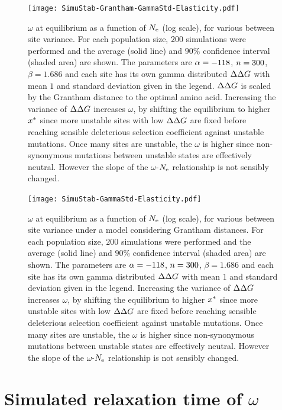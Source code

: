 \begin{figure}[H]
    \centering
    \texttt{[image: SimuStab-Grantham-GammaStd-Elasticity.pdf]}
    \caption[Effect of site variance on the susceptibility]{
    $\omega$ at equilibrium as a function of $N_{\text{e}}$ (log scale), for various between site variance.
    For each population size, $200$ simulations were performed and the average (solid line) and $90\%$ confidence interval (shaded area) are shown.
    The parameters are $\alpha=-118$, $n=300$, $\beta=1.686$ and each site has its own gamma distributed $\Delta \Delta G$ with mean $1$ and standard deviation given in the legend. $\Delta \Delta G$ is scaled by the Grantham distance to the optimal amino acid.
    Increasing the variance of $\Delta \Delta G$ increases $\omega$, by shifting the equilibrium to higher $x^{*}$ since more unstable sites with low $\Delta \Delta G$ are fixed before reaching sensible deleterious selection coefficient against unstable mutations. Once many sites are unstable, the $\omega$ is higher since non-synonymous mutations between unstable states are effectively neutral. However the slope of the $\omega$-$N_{\text{e}}$ relationship is not sensibly changed.
    }
\end{figure}

\begin{figure}[H]
    \centering
    \texttt{[image: SimuStab-GammaStd-Elasticity.pdf]}
    \caption[Effect of site variance on the susceptibility without Grantham distance]{
    $\omega$ at equilibrium as a function of $N_{\text{e}}$ (log scale), for various between site variance under a model considering Grantham distances.
    For each population size, $200$ simulations were performed and the average (solid line) and $90\%$ confidence interval (shaded area) are shown.
    The parameters are $\alpha=-118$, $n=300$, $\beta=1.686$ and each site has its own gamma distributed $\Delta \Delta G$ with mean $1$ and standard deviation given in the legend.
    Increasing the variance of $\Delta \Delta G$ increases $\omega$, by shifting the equilibrium to higher $x^{*}$ since more unstable sites with low $\Delta \Delta G$ are fixed before reaching sensible deleterious selection coefficient against unstable mutations. Once many sites are unstable, the $\omega$ is higher since non-synonymous mutations between unstable states are effectively neutral. However the slope of the $\omega$-$N_{\text{e}}$ relationship is not sensibly changed.
    }
\end{figure}


\section{Simulated relaxation time of \texorpdfstring{$\omega$}{ω}}
\label{sec:simulated-relaxation-time-of-omega}

